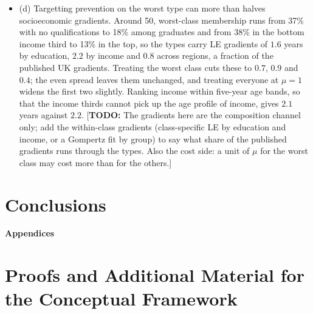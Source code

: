 \documentclass[11pt]{article}
\newcommand{\todo}[1]{\textcolor{red!75!black}{[\textbf{TODO:} #1]}}
\begin{document}
\begin{itemize}
		\item (d) Targetting prevention on the worst type can more than halves socioeconomic gradients. Around 50, worst-class membership runs from 37\% with no qualifications to 18\% among graduates and from 38\% in the bottom income third to 13\% in the top, so the types carry LE gradients of $1.6$ years by education, $2.2$ by income and $0.8$ across regions, a fraction of the published UK gradients. Treating the worst class cuts these to $0.7$, $0.9$ and $0.4$; the even spread leaves them unchanged, and treating everyone at $\mu=1$ widens the first two slightly. Ranking income within five-year age bands, so that the income thirds cannot pick up the age profile of income, gives $2.1$ years against $2.2$. \todo{The gradients here are the composition channel only; add the within-class gradients (class-specific LE by education and income, or a Gompertz fit by group) to say what share of the published gradients runs through the types. Also the cost side: a unit of $\mu$ for the worst class may cost more than for the others.}
	\end{itemize}
	
	
	\section{Conclusions}
	
	
	
	
	
	

	\clearpage
	\appendix
	
	\setcounter{page}{0}
	\setcounter{figure}{0}
	\setcounter{table}{0}
	\setcounter{equation}{0}
	
	
	
	\begin{center}
		{\LARGE\bf Appendices}
	\end{center}
	\medskip
	
	\renewcommand{\thefigure}{\thesection.\arabic{figure}}
	\renewcommand{\thetable}{\thesection.\arabic{table}}
	\renewcommand{\theequation}{\thesection.\arabic{equation}}
	
	
	\section{Proofs and Additional Material for the Conceptual Framework}
	\label{app:conceptual}
\end{document}
